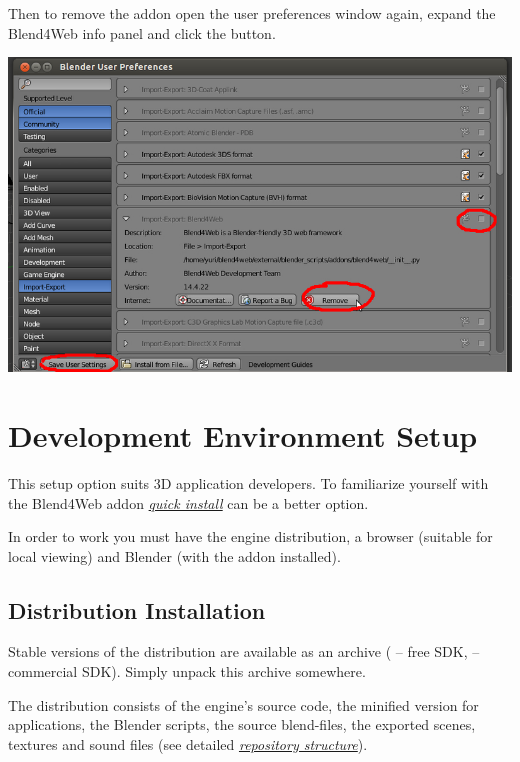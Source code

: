 \documentclass[a4paper,12pt,oneside]{sphinxmanual}
\begin{document}
Then to remove the addon open the user preferences window again, expand the Blend4Web info panel and click the  button.

{\hfill\includegraphics[width=1.000\linewidth]{user_preferences_disable_addon.jpg}\hfill}

\begin{DUlineblock}{0em}
\item[] 
\end{DUlineblock}


\chapter{Development Environment Setup}
\label{setup:setup}\label{setup::doc}\label{setup:id1}
This setup option suits 3D application developers. To familiarize yourself with the Blend4Web addon {\hyperref[first_steps:quick-install]{\emph{quick install}}} can be a better option.

In order to work you must have the engine distribution, a browser (suitable for local viewing) and Blender (with the addon installed).


\section{Distribution Installation}
\label{setup:getting-started-distribution}\label{setup:id2}
Stable versions of the distribution are available as an archive ( -- free SDK,  -- commercial SDK). Simply unpack this archive somewhere.

The distribution consists of the engine's source code, the minified version for applications, the Blender scripts, the source blend-files, the exported scenes, textures and sound files (see detailed {\hyperref[developers:repo-file-structure]{\emph{repository structure}}}).
\end{document}
